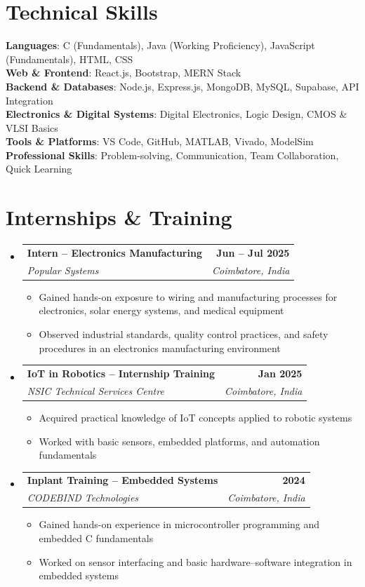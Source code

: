 \documentclass[letterpaper,11pt]{article}
\makeatletter
\newcommand{\resumeItem}[1]{
  \item\small{{#1 \vspace{-2pt}}}
}
\newcommand{\resumeSubheading}[4]{
  \vspace{-2pt}\item
  \begin{tabular*}{1.0\textwidth}[t]{l@{\extracolsep{\fill}}r}
    \textbf{#1} & \textbf{\small #2} \\
    \textit{\small#3} & \textit{\small #4} \\
  \end{tabular*}\vspace{-7pt}
}
\newcommand{\resumeSubHeadingListStart}{\begin{itemize}[leftmargin=0.0in, label={}]}
\newcommand{\resumeSubHeadingListEnd}{\end{itemize}}
\newcommand{\resumeItemListStart}{\begin{itemize}}
\newcommand{\resumeItemListEnd}{\end{itemize}\vspace{-5pt}}
\makeatother
\begin{document}
\section{Technical Skills}
\begin{itemize}[leftmargin=0.15in, label={}]
  \small{\item{
    \textbf{Languages}{: C (Fundamentals), Java (Working Proficiency), JavaScript (Fundamentals), HTML, CSS} \\
    \textbf{Web \& Frontend}{: React.js, Bootstrap, MERN Stack} \\
    \textbf{Backend \& Databases}{: Node.js, Express.js, MongoDB, MySQL, Supabase, API Integration} \\
    \textbf{Electronics \& Digital Systems}{: Digital Electronics, Logic Design, CMOS \& VLSI Basics} \\
    \textbf{Tools \& Platforms}{: VS Code, GitHub, MATLAB, Vivado, ModelSim} \\
    \textbf{Professional Skills}{: Problem-solving, Communication, Team Collaboration, Quick Learning} \\
  }}
\end{itemize}

\section{Internships \& Training}
\resumeSubHeadingListStart
  \resumeSubheading
    {Intern -- Electronics Manufacturing}{Jun -- Jul 2025}
    {Popular Systems}{Coimbatore, India}
    \resumeItemListStart
      \resumeItem{Gained hands-on exposure to wiring and manufacturing processes for electronics, solar energy systems, and medical equipment}
      \resumeItem{Observed industrial standards, quality control practices, and safety procedures in an electronics manufacturing environment}
    \resumeItemListEnd

  \resumeSubheading
    {IoT in Robotics -- Internship Training}{Jan 2025}
    {NSIC Technical Services Centre}{Coimbatore, India}
    \resumeItemListStart
      \resumeItem{Acquired practical knowledge of IoT concepts applied to robotic systems}
      \resumeItem{Worked with basic sensors, embedded platforms, and automation fundamentals}
    \resumeItemListEnd

  \resumeSubheading
    {Inplant Training -- Embedded Systems}{2024}
    {CODEBIND Technologies}{Coimbatore, India}
    \resumeItemListStart
      \resumeItem{Gained hands-on experience in microcontroller programming and embedded C fundamentals}
      \resumeItem{Worked on sensor interfacing and basic hardware--software integration in embedded systems}
    \resumeItemListEnd
\resumeSubHeadingListEnd
\end{document}
